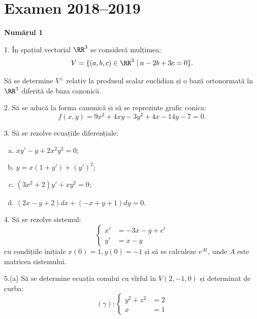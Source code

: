 
\chapter{Examen 2018--2019}

\textbf{Numărul 1}

1. În spațiul vectorial $ \RR^3 $ se consideră mulțimea:
\[
  V = \{ (a, b, c) \in \RR^3 \mid a - 2b + 3c = 0 \}.
\]

Să se determine $V^\perp$ relativ la produsul scalar euclidian și o
bază ortonormată în $ \RR^3 $ diferită de baza canonică.

\vspace{1cm}

2. Să se aducă la forma canonică și să se reprezinte grafic conica:
\[
  f(x, y) = 9x^2 + 4xy - 3y^2 + 4x - 14y - 7 = 0.
\]


\vspace{1cm}

3. Să se rezolve ecuațiile diferențiale:
\begin{enumerate}[(a)]
  \item $ xy' - y + 2x^2y^2 = 0 $;
  \item $ y = x(1 + y') + (y')^2 $;
  \item $ (3x^2 + 2) y' + xy^2 = 0 $;
  \item $ (2x - y + 2) dx + (-x + y + 1) dy = 0 $.
\end{enumerate}

\vspace{1cm}

4. Să se rezolve sistemul:
\[
  \begin{cases}
    x' &= -3x - y + e^t \\
    y' &= x - y
  \end{cases}
\]
cu condițiile inițiale $ x(0) = 1, y(0) = -1 $ și să se calculeze
$ e^{At}$, unde $ A $ este matricea sistemului.

\vspace{1cm}

5.(a) Să se determine ecuația conului cu vîrful în $ V(2, -1, 0) $ și
determinat de curba\footnotemark:
\[
  (\gamma) : \begin{cases}
    y^2 + z^2 &= 2 \\
    x &= 1
  \end{cases}
\]


